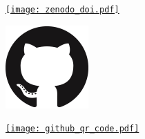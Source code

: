 \documentclass[princeton,portrait]{a0poster}
\begin{document}
\begin{minipage}[b]{\linewidth}
\begin{minipage}{0.22\linewidth}
   \vspace{-0.5cm}
   \begin{center}
    \href{https://doi.org/10.5281/zenodo.1169739}{\texttt{[image: zenodo\_doi.pdf]}}
   \end{center}
 \end{minipage}%
 \begin{minipage}{0.2\linewidth}
  \begin{minipage}{0.25\linewidth}
   \begin{flushleft}
    \href{https://github.com/scikit-hep/pyhf}{\includegraphics[width=\linewidth]{GitHub_logo.png}}
   \end{flushleft}
  \end{minipage}%
  \begin{minipage}{0.25\linewidth}
   \begin{flushleft}
    \href{https://github.com/scikit-hep/pyhf}{\texttt{[image: github\_qr\_code.pdf]}}
   \end{flushleft}
  \end{minipage}%
  \hspace{5cm}
 \end{minipage}%
 \vspace{-1cm}
\end{minipage}
\end{document}
